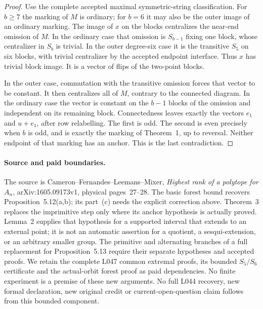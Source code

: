 \documentclass[11pt,a4paper]{article}
\begin{document}
\begin{proof}
Use the complete accepted maximal symmetric-string classification.
For $b\geq7$ the marking of $M$ is ordinary; for $b=6$ it
may also be the outer image of an ordinary marking.
The image of $x$ on the blocks centralizes the near-end
omission of $M$. In the ordinary case that omission is
$S_{b-1}$ fixing one block, whose centralizer in $S_b$ is
trivial. In the outer degree-six case it is the transitive
$S_5$ on six blocks, with trivial centralizer by the accepted
endpoint interface. Thus $x$ has trivial block image.
It is a vector of flips of the two-point blocks.

In the outer case, commutation with the transitive omission
forces that vector to be constant. It then centralizes all
of $M$, contrary to the connected diagram. In the ordinary
case the vector is constant on the $b-1$ blocks of the omission
and independent on its remaining block. Connectedness leaves
exactly the vectors $e_1$ and $u+e_1$, after row relabelling.
The first is odd. The second is even precisely when $b$ is
odd, and is exactly the marking of Theorem~1, up to reversal.
Neither endpoint of that marking has an anchor. This is the
last contradiction.
\end{proof}

\paragraph{Source and paid boundaries.}
The source is Cameron--Fernandes--Leemans--Mixer,
\emph{Highest rank of a polytope for $A_n$},
arXiv:1605.09173v1, physical pages~27--28. The basic forest
bound recovers Proposition~5.12(a,b); its part~(c) needs the
explicit correction above. Theorem~3 replaces the imprimitive
step only where its anchor hypothesis is actually proved.
Lemma~2 supplies that hypothesis for a supported interval that
extends to an external point; it is not an automatic assertion
for a quotient, a sesqui-extension, or an arbitrary smaller group.
The primitive and alternating branches of a full replacement
for Proposition~5.13 require their separate hypotheses and
accepted proofs. We retain the complete L047 common extremal
proofs, its bounded $S_5/S_6$ certificate and the actual-orbit
forest proof as paid dependencies. No finite experiment is a
premise of these new arguments. No full L044 recovery, new
formal declaration, new original credit or current-open-question
claim follows from this bounded component.
\end{document}
